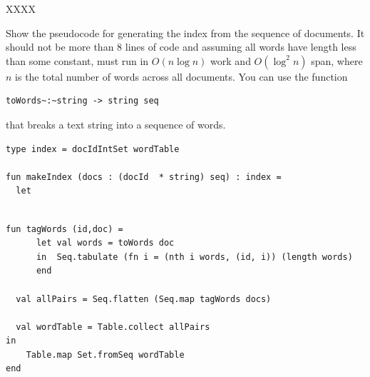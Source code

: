 \begin{problem}%
XXXX

\ask
Show the pseudocode for generating the index from the sequence of documents.
It should not be more than 8 lines of code and assuming all words have
length less than some constant, must run in $O(n \log n)$ work and
$O(\log^2 n)$ span, where $n$ is the total number of words across all
documents.    
%
You can use the function
%
\begin{lstlisting}[language=caml,numbers=none]
toWords~:~string -> string seq
\end{lstlisting}
%
that breaks a text string into a sequence of words.

\begin{lstlisting}[language=caml, numbers=none]
type index = docIdIntSet wordTable

fun makeIndex (docs : (docId  * string) seq) : index =
  let


\end{lstlisting}

\sol

\begin{lstlisting}[numbers=none]
  fun tagWords (id,doc) = 
      let val words = toWords doc
      in  Seq.tabulate (fn i = (nth i words, (id, i)) (length words) 
      end

  val allPairs = Seq.flatten (Seq.map tagWords docs)

  val wordTable = Table.collect allPairs
in
    Table.map Set.fromSeq wordTable
end
\end{lstlisting}
\end{problem}

